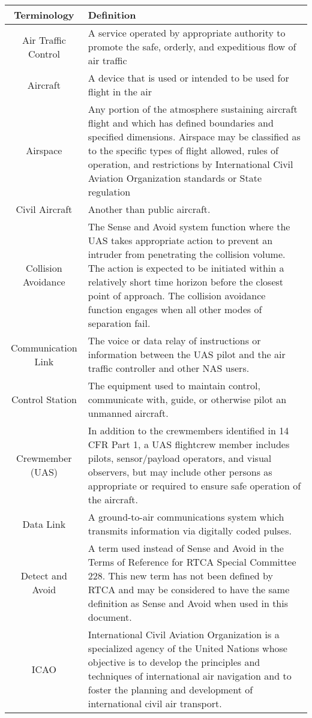 \begin{tabularx}{\textwidth}{S{0.22}|X} 
    \toprule
     Terminology &Definition  \\\hline
    \midrule
    \endhead
     Air Traffic Control & A service operated by appropriate authority to promote the safe, orderly, and expeditious flow of air traffic\\\hline
     Aircraft & A device that is used or intended to be used for flight in the air\\\hline
     Airspace & Any portion of the atmosphere sustaining aircraft flight and which has defined boundaries and specified dimensions. Airspace may be classified as to the specific types of flight allowed, rules of operation, and restrictions by International Civil Aviation Organization standards or State regulation\\\hline
     Civil Aircraft & Another than public aircraft. \\\hline
     Collision \mbox{Avoidance} & The Sense and Avoid system function where the UAS takes appropriate action to prevent an intruder from penetrating the collision volume. The action is expected to be initiated within a relatively short time horizon before the closest point of approach. The collision avoidance function engages when all other modes of separation fail.\\\hline
     Communication Link & The voice or data relay of instructions or information between the UAS pilot and the air traffic controller and other NAS users.\\\hline
     Control Station & The equipment used to maintain control, communicate with, guide, or otherwise pilot an unmanned aircraft.\\\hline
     Crewmember (UAS) & In addition to the crewmembers identified in 14 CFR Part 1, a UAS flightcrew member includes pilots, sensor/payload operators, and visual observers, but may include other persons as appropriate or required to ensure safe operation of the aircraft.\\\hline
     Data Link & A ground-to-air communications system which transmits information via digitally coded pulses.\\\hline
     Detect and Avoid & A term used instead of Sense and Avoid in the Terms of Reference for RTCA Special Committee 228. This new term has not been defined by RTCA and may be considered to have the same definition as Sense and Avoid when used in this document.\\\hline
     ICAO & International Civil Aviation Organization is a specialized agency of the United Nations whose objective is to develop the principles and techniques of international air navigation and to foster the planning and development of international civil air transport.\\\hline

\end{tabularx}
